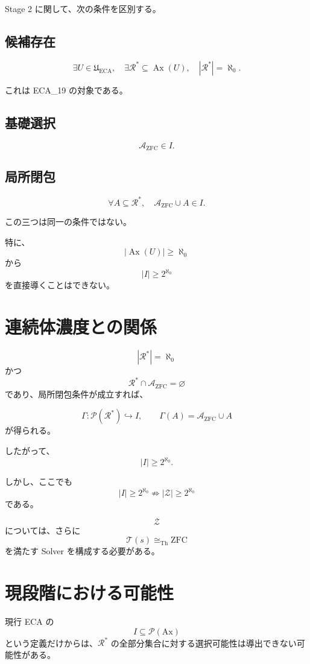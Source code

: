 \documentclass[a4paper,11pt]{article}
\newcommand{\Ax}{\mathrm{Ax}}
\begin{document}
Stage 2 に関して、次の条件を区別する。

\subsection*{候補存在}
\[
\exists U\in\mathfrak U_{\mathrm{ECA}},
\quad
\exists\mathcal{R}^*
\subseteq\operatorname{Ax}(U),
\quad
|\mathcal{R}^*|=\aleph_0.
\]

これは ECA_19 の対象である。

\subsection*{基礎選択}
\[
\mathcal{A}_{\mathrm{ZFC}}\in I.
\]

\subsection*{局所閉包}
\[
\forall A\subseteq\mathcal{R}^*,
\quad
\mathcal{A}_{\mathrm{ZFC}}\cup A\in I.
\]

この三つは同一の条件ではない。

特に、
\[
|\operatorname{Ax}(U)|\ge\aleph_0
\]
から
\[
|I|\ge2^{\aleph_0}
\]
を直接導くことはできない。

\section{連続体濃度との関係}

\[
|\mathcal{R}^*|=\aleph_0
\]
かつ
\[
\mathcal{R}^*\cap\mathcal{A}_{\mathrm{ZFC}}=\varnothing
\]
であり、局所閉包条件が成立すれば、

\[
\Gamma:
\mathcal{P}(\mathcal{R}^*)\hookrightarrow I,
\qquad
\Gamma(A)=\mathcal{A}_{\mathrm{ZFC}}\cup A
\]
が得られる。

したがって、
\[
|I|\ge2^{\aleph_0}.
\]

しかし、ここでも
\[
|I|\ge2^{\aleph_0}
\not\Rightarrow
|\mathcal Z|\ge2^{\aleph_0}
\]
である。

\[
\mathcal Z
\]
については、さらに
\[
\mathcal T(s)\cong_{\mathrm{Th}}\mathrm{ZFC}
\]
を満たす Solver を構成する必要がある。

\section{現段階における可能性}

現行 ECA の
\[
I\subseteq\mathcal{P}(\Ax)
\]
という定義だけからは、$\mathcal{R}^*$ の全部分集合に対する選択可能性は導出できない可能性がある。
\end{document}
